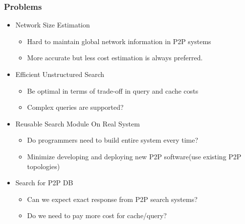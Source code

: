 \documentclass[red]{beamer}
\begin{document}
\begin{frame}
\frametitle{Problems}
\begin{itemize}
\item<1> Network Size Estimation
\begin{itemize}
\item Hard to maintain global network information in P2P systems
\item More accurate but less cost estimation is always preferred. 
\end{itemize}
\item<2> Efficient Unstructured Search
\begin{itemize}
\item Be optimal in terms of trade-off in query and cache costs
\item Complex queries are supported?
\end{itemize}
\item<3> Reusable Search Module On Real System
\begin{itemize}
\item Do programmers need to build entire system every time?
\item Minimize developing and deploying new P2P software(use existing P2P topologies)
\end{itemize}
\item<4-> Search for P2P DB
\begin{itemize}
\item Can we expect exact response from P2P search systems?
\item Do we need to pay more cost for cache/query?
\end{itemize}
\end{itemize}
\end{frame}
\end{document}
